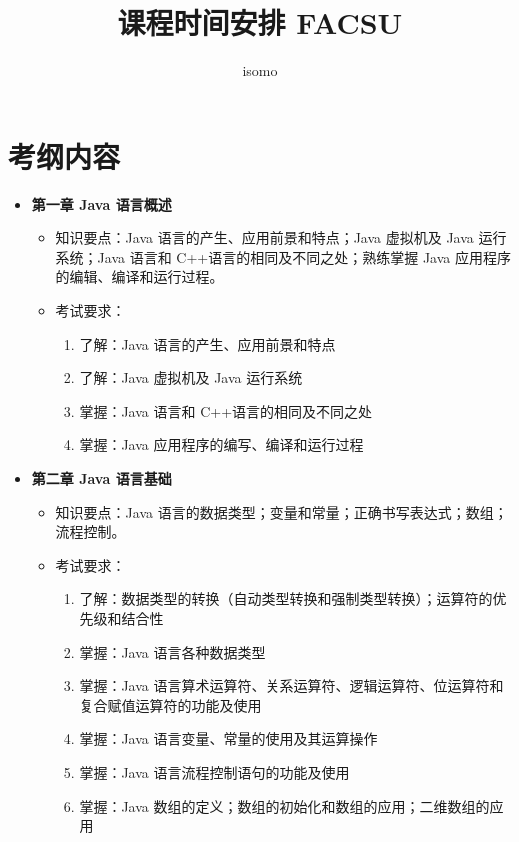 \documentclass{../note}
\title{课程时间安排 FACSU}
\author{isomo}
\begin{document}
\maketitle

\section{考纲内容}
\begin{itemize}
  \item \textbf{第一章 Java 语言概述}
    \begin{itemize}
      \item 知识要点：Java 语言的产生、应用前景和特点；Java 虚拟机及 Java 运行系统；Java 语言和 C++语言的相同及不同之处；熟练掌握 Java 应用程序的编辑、编译和运行过程。
      \item 考试要求：
        \begin{enumerate}
          \item 了解：Java 语言的产生、应用前景和特点
          \item 了解：Java 虚拟机及 Java 运行系统
          \item 掌握：Java 语言和 C++语言的相同及不同之处
          \item 掌握：Java 应用程序的编写、编译和运行过程
        \end{enumerate}
    \end{itemize}

  \item \textbf{第二章 Java 语言基础}
    \begin{itemize}
      \item 知识要点：Java 语言的数据类型；变量和常量；正确书写表达式；数组；流程控制。
      \item 考试要求：
        \begin{enumerate}
          \item 了解：数据类型的转换（自动类型转换和强制类型转换）；运算符的优先级和结合性
          \item 掌握：Java 语言各种数据类型
          \item 掌握：Java 语言算术运算符、关系运算符、逻辑运算符、位运算符和复合赋值运算符的功能及使用
          \item 掌握：Java 语言变量、常量的使用及其运算操作
          \item 掌握：Java 语言流程控制语句的功能及使用
          \item 掌握：Java 数组的定义；数组的初始化和数组的应用；二维数组的应用
        \end{enumerate}
    \end{itemize}


\end{itemize}
\end{document}
